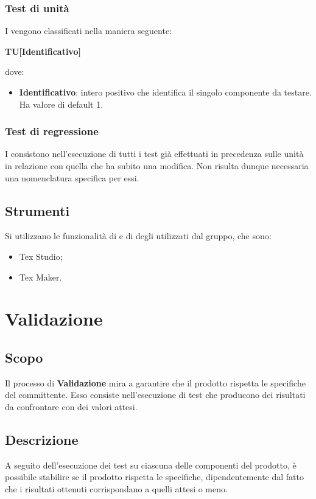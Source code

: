 \documentclass[]{article}
\begin{document}
		\subsubsection{Test di unità}
		I  vengono classificati nella maniera seguente:
		\begin{center}
			\textbf{TU[Identificativo]}
		\end{center}		
		dove:\\
		\begin{itemize}
			\item \textbf{Identificativo}: intero positivo che identifica il singolo componente da testare. Ha valore di default 1.
		\end{itemize}
		
		\subsubsection{Test di regressione}
		I  consistono nell'esecuzione di tutti i test già effettuati in precedenza sulle unità in relazione con quella che ha subito una modifica. Non risulta dunque necessaria una nomenclatura specifica per essi.
		
		\subsection{Strumenti}
		Si utilizzano le funzionalità di  e di  degli  utilizzati dal gruppo, che sono:
		\begin{itemize}
			\item Tex Studio;
			\item Tex Maker.
		\end{itemize}		 		

		\section{Validazione}
		\subsection{Scopo}
		Il processo di \textbf{Validazione} mira a garantire che il prodotto rispetta le specifiche del committente. Esso consiste nell'esecuzione di test che producono dei risultati da confrontare con dei valori attesi.
		
		\subsection{Descrizione}
		A seguito dell'esecuzione dei test su ciascuna delle componenti del prodotto, è possibile stabilire se il prodotto rispetta le specifiche, dipendentemente dal fatto che i risultati ottenuti corrispondano a quelli attesi o meno. 
	
\end{document}
